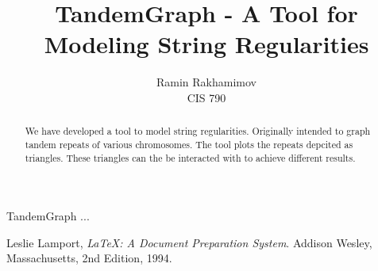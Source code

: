 \documentclass[a4paper,12pt]{article}
\begin{document}
\title{\Large TandemGraph - A Tool for Modeling String Regularities}
\author{Ramin Rakhamimov \\
        CIS 790}
\maketitle

\begin{abstract}
We have developed a tool to model string regularities. Originally intended to graph tandem repeats of various chromosomes. The tool plots the repeats depcited as triangles. These triangles can the be interacted with to achieve different results.
\end{abstract}
TandemGraph \cite{lamport94} ...


\begin{thebibliography}{9}
 
  Leslie Lamport,
  \emph{\LaTeX: A Document Preparation System}.
  Addison Wesley, Massachusetts,
  2nd Edition,
  1994.
 
\end{thebibliography}
\end{document}

